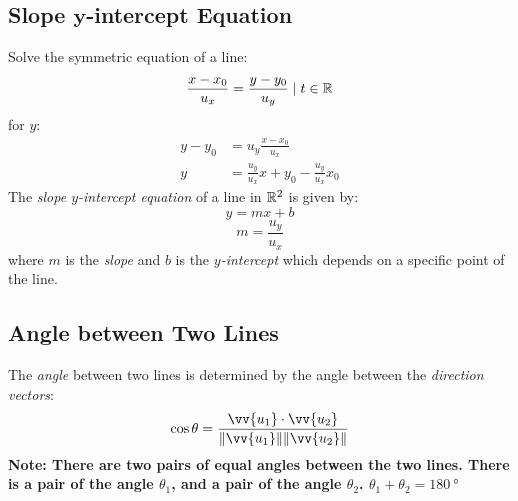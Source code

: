 \subsection[Slope $y$-intercept Equation]{Slope $\boldsymbol{y}$-intercept Equation}
	Solve the symmetric equation of a line:
	\[\frac{x - x_0}{u_x} = \frac{y - y_0}{u_y} \mid t \in \mathbb{R}\]
	for $y$:
	\begin{align*}
		y - y_0 &= u_y \frac{x - x_0}{u_x}\\
		y &= \frac{u_y}{u_x}x + y_0 - \frac{u_y}{u_x}x_0
	\end{align*}
	The \emph{slope $y$-intercept equation} of a line in $\mathbb{R}^2$ is given by:
	\[y = mx + b\]
	\[m = \frac{u_y}{u_x}\]
	where $m$ is the \emph{slope} and  $b$ is the \emph{$y$-intercept} which depends on a specific point of the line.
\subsection{Angle between Two Lines}
	The \emph{angle} between two lines is determined by the angle between the \emph{direction vectors}:
	\[\cos \theta = \frac{\vv{u_1} \cdot \vv{u_2}}{\norm{\vv{u_1}} \norm{\vv{u_2}}}\]
	\textbf{Note: There are two pairs of equal angles between the two lines.
	There is a pair of the angle $\theta_1$, and a pair of the angle $\theta_2$.
	$\theta_1 + \theta_2 = \SI{180}{\degree}$}
